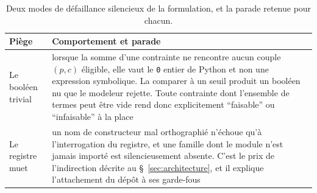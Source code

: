 \begin{table}[H]
  \centering
  \caption{Deux modes de défaillance silencieux de la formulation, et la parade retenue pour
  chacun.}
  \label{tab:ann-pieges}
  \scriptsize
  \setlength{\tabcolsep}{4pt}
  \begin{tabularx}{\textwidth}{@{}>{\raggedright\arraybackslash}p{30mm}X@{}}
    \toprule
    \textbf{Piège} & \textbf{Comportement et parade} \\
    \midrule
    Le booléen trivial & lorsque la somme d'une contrainte ne rencontre aucun couple $(p,c)$
      éligible, elle vaut le \texttt{0} entier de Python et non une expression symbolique. La
      comparer à un seuil produit un booléen nu que le modeleur rejette. Toute contrainte dont
      l'ensemble de termes peut être vide rend donc explicitement \enquote{faisable} ou
      \enquote{infaisable} à la place \\
    Le registre muet & un nom de constructeur mal orthographié n'échoue qu'à l'interrogation du
      registre, et une famille dont le module n'est jamais importé est silencieusement absente.
      C'est le prix de l'indirection décrite au §~\ref{sec:architecture}, et il explique
      l'attachement du dépôt à ses garde-fous \\
    \bottomrule
  \end{tabularx}
\end{table}
